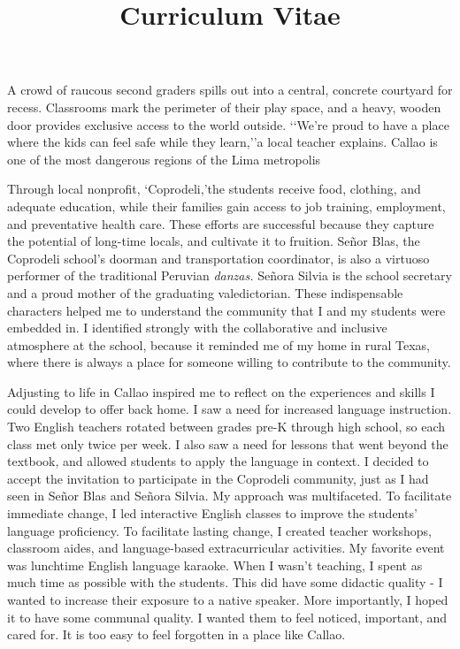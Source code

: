 \documentclass[12pt,a4paper,roman]{moderncv} %
\title{Curriculum Vitae}
\begin{document}


\clearpage


A crowd of raucous second graders spills out into a central, concrete courtyard for recess. Classrooms mark the perimeter of their play space, and a heavy, wooden door provides exclusive access to the world outside. \lq\lq We're proud to have a place where the kids can feel safe while they learn,\rq\rq a local teacher explains. Callao is one of the most dangerous regions of the Lima metropolis

\medskip
 
Through local nonprofit, \lq Coprodeli,\rq the students receive food, clothing, and adequate education, while their families gain access to job training, employment, and preventative health care. These efforts are successful because they capture the potential of long-time locals, and cultivate it to fruition. Se\~nor Blas, the Coprodeli school's doorman and transportation coordinator, is also a virtuoso performer of the traditional Peruvian \textit{danzas.} Se\~nora Silvia is the school secretary and a proud mother of the graduating valedictorian. These indispensable characters helped me to understand the community that I and my students were embedded in. I identified strongly with the collaborative and inclusive atmosphere at the school, because it reminded me of my home in rural Texas, where there is always a place for someone willing to contribute to the community.

\medskip

Adjusting to life in Callao inspired me to reflect on the experiences and skills I could develop to offer back home. I saw a need for increased language instruction. Two English teachers rotated between grades pre-K through high school, so each class met only twice per week. I also saw a need for lessons that went beyond the textbook, and allowed students to apply the language in context. I decided to accept the invitation to participate in the Coprodeli community, just as I had seen in Se\~nor Blas and Se\~nora Silvia.  My approach was multifaceted. To facilitate immediate change, I led interactive English classes to improve the students' language proficiency. To facilitate lasting change, I created teacher workshops, classroom aides, and language-based extracurricular activities. My favorite event was lunchtime English language karaoke. When I wasn't teaching, I spent as much time as possible with the students. This did have some didactic quality - I wanted to increase their exposure to a native speaker. More importantly, I hoped it to have some communal quality. I wanted them to feel noticed, important, and cared for. It is too easy to feel forgotten in a place like Callao.
\end{document}
